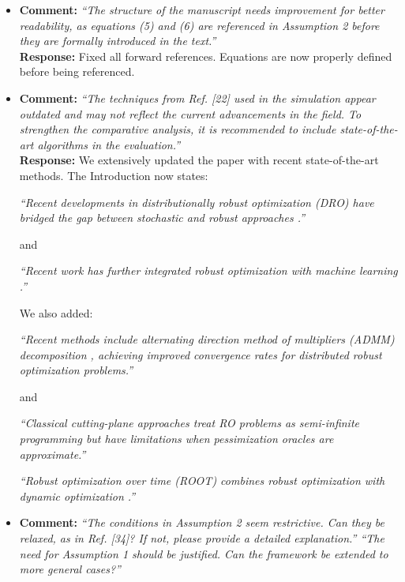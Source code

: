 \documentclass[journal,twoside,web]{ieeecolor}
\begin{document}
\begin{itemize}
\item \textbf{Comment:} \textit{``The structure of the manuscript needs improvement for better readability, as equations (5) and (6) are referenced in Assumption 2 before they are formally introduced in the text.''}\\

\textbf{Response:} Fixed all forward references. Equations are now properly defined before being referenced.\\

\item  \textbf{Comment:} \textit{``The techniques from Ref. [22] used in the simulation appear outdated and may not reflect the current advancements in the field. To strengthen the comparative analysis, it is recommended to include state-of-the-art algorithms in the evaluation.''}\\

\textbf{Response:} We extensively updated the paper with recent state-of-the-art methods. The Introduction now states: 

{\color{revisionblue}\textit{``Recent developments in distributionally robust optimization (DRO) have bridged the gap between stochastic and robust approaches \cite{aigner2023,yang2023}.''}}

and 

{\color{revisionblue}\textit{``Recent work has further integrated robust optimization with machine learning \cite{zhu2023zeroth,madry2018adversarial}.''}}

We also added:

{\color{revisionblue}\textit{``Recent methods include alternating direction method of multipliers (ADMM) decomposition \cite{rostampour2021}, achieving improved convergence rates for distributed robust optimization problems.''}}

and

{\color{revisionblue}\textit{``Classical cutting-plane approaches \cite{mutapcic2009} treat RO problems as semi-infinite programming but have limitations when pessimization oracles are approximate.''}}

{\color{revisionblue}\textit{``Robust optimization over time (ROOT) combines robust optimization with dynamic optimization \cite{yazdani2023,aigner2023}.''}}\\

\item  \textbf{Comment:} \textit{``The conditions in Assumption 2 seem restrictive. Can they be relaxed, as in Ref. [34]? If not, please provide a detailed explanation.'' ``The need for Assumption 1 should be justified. Can the framework be extended to more general cases?''}\\


\end{itemize}
\end{document}
